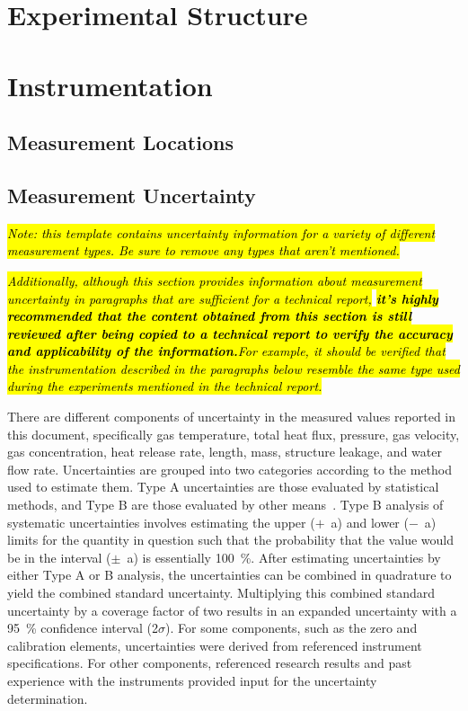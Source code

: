 \documentclass[12pt,oneside]{book}
\begin{document}
\section{Experimental Structure}

\section{Instrumentation}
\label{sec:instrument}

\subsection{Measurement Locations}
\label{subsec:measure_locs}

\subsection{Measurement Uncertainty}
\label{subsec:uncertainty}

\textit{\hl{Note: this template contains uncertainty information for a variety of different measurement types. Be sure to remove any types that aren't mentioned.}} 

\textit{\hl{Additionally, although this section provides information about measurement uncertainty in paragraphs that are sufficient for a technical report,}\textbf{\hl{ it's highly recommended that the content obtained from this section is still reviewed after being copied to a technical report to verify the accuracy and applicability of the information.}}\hl{For example, it should be verified that the instrumentation described in the paragraphs below resemble the same type used during the experiments mentioned in the technical report.}}

There are different components of uncertainty in the measured values reported in this document, specifically gas temperature, total heat flux, pressure, gas velocity, gas concentration, heat release rate, length, mass, structure leakage, and water flow rate. Uncertainties are grouped into two categories according to the method used to estimate them. Type A uncertainties are those evaluated by statistical methods, and Type B are those evaluated by other means~\cite{Taylor&Kuyatt:1994}. Type B analysis of systematic uncertainties involves estimating the upper ($+$~a) and lower ($-$~a) limits for the quantity in question such that the probability that the value would be in the interval ($\pm$~a) is essentially 100~\%. After estimating uncertainties by either Type A or B analysis, the uncertainties can be combined in quadrature to yield the combined standard uncertainty. Multiplying this combined standard uncertainty by a coverage factor of two results in an expanded uncertainty with a 95~\% confidence interval (2$\sigma$). For some components, such as the zero and calibration elements, uncertainties were derived from referenced instrument specifications. For other components, referenced research results and past experience with the instruments provided input for the uncertainty determination.
\end{document}

